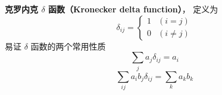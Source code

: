 
\begin{issues}
\end{issues}

\textbf{克罗内克 $\delta$ 函数（Kronecker delta function）}， 定义为
\begin{equation}\label{Kronec_eq2}
\delta_{ij} =
\begin{cases}
1 & (i = j)\\
0 & (i \ne j)
\end{cases}
\end{equation}
易证 $\delta$ 函数的两个常用性质
\begin{equation}\label{Kronec_eq1}
\sum_j a_j \delta_{ij} = a_i
\end{equation}
\begin{equation}
\sum_{ij} a_i b_j \delta_{ij} = \sum_k a_k b_k
\end{equation}
